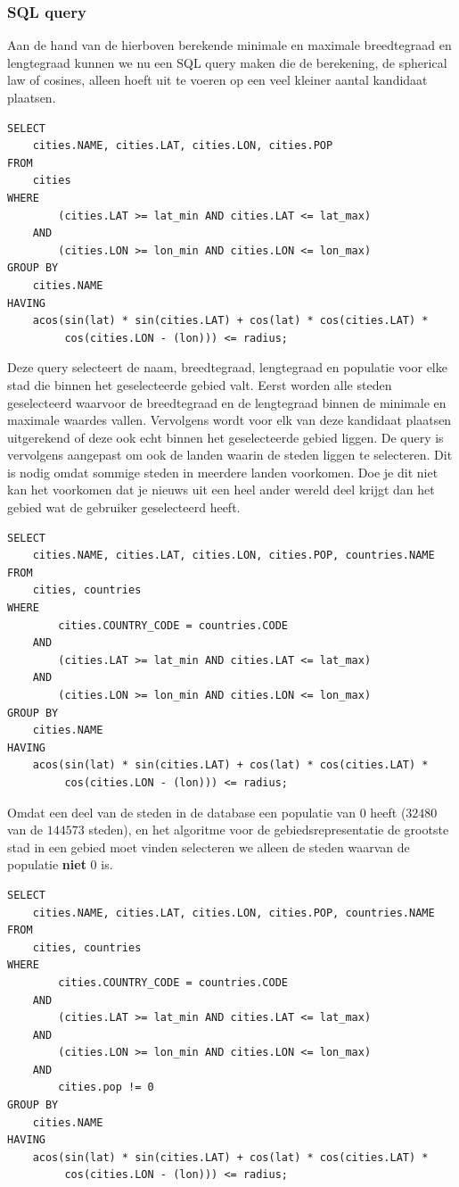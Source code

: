 \documentclass[twoside,openright]{uva-bachelor-thesis}
\begin{document}
		\subsubsection{SQL query}
		Aan de hand van de hierboven berekende minimale en maximale breedtegraad en lengtegraad kunnen we nu een SQL query maken die de berekening, de spherical law of cosines, alleen hoeft uit te voeren op een veel kleiner aantal kandidaat plaatsen.
\begin{verbatim}
SELECT
    cities.NAME, cities.LAT, cities.LON, cities.POP
FROM 
    cities 
WHERE 
        (cities.LAT >= lat_min AND cities.LAT <= lat_max) 
    AND 
        (cities.LON >= lon_min AND cities.LON <= lon_max) 
GROUP BY
    cities.NAME
HAVING
    acos(sin(lat) * sin(cities.LAT) + cos(lat) * cos(cities.LAT) * 
         cos(cities.LON - (lon))) <= radius;
\end{verbatim}
Deze query selecteert de naam, breedtegraad, lengtegraad en populatie voor elke stad die binnen het geselecteerde gebied valt. Eerst worden alle steden geselecteerd waarvoor de breedtegraad en de lengtegraad binnen de minimale en maximale waardes vallen. Vervolgens wordt voor elk van deze kandidaat plaatsen uitgerekend of deze ook echt binnen het geselecteerde gebied liggen. De query is vervolgens aangepast om ook de landen waarin de steden liggen te selecteren. Dit is nodig omdat sommige steden in meerdere landen voorkomen. Doe je dit niet kan het voorkomen dat je nieuws uit een heel ander wereld deel krijgt dan het gebied wat de gebruiker geselecteerd heeft.
\begin{verbatim}
SELECT
    cities.NAME, cities.LAT, cities.LON, cities.POP, countries.NAME
FROM 
    cities, countries 
WHERE
        cities.COUNTRY_CODE = countries.CODE 
    AND
        (cities.LAT >= lat_min AND cities.LAT <= lat_max) 
    AND 
        (cities.LON >= lon_min AND cities.LON <= lon_max) 
GROUP BY
    cities.NAME
HAVING
    acos(sin(lat) * sin(cities.LAT) + cos(lat) * cos(cities.LAT) * 
         cos(cities.LON - (lon))) <= radius;
\end{verbatim}
Omdat een deel van de steden in de database een populatie van $0$ heeft ($32480$ van de $144573$ steden), en het algoritme voor de gebiedsrepresentatie de grootste stad in een gebied moet vinden selecteren we alleen de steden waarvan de populatie \textbf{niet} $0$ is.
\begin{verbatim}
SELECT
    cities.NAME, cities.LAT, cities.LON, cities.POP, countries.NAME
FROM 
    cities, countries 
WHERE
        cities.COUNTRY_CODE = countries.CODE 
    AND
        (cities.LAT >= lat_min AND cities.LAT <= lat_max) 
    AND 
        (cities.LON >= lon_min AND cities.LON <= lon_max)
    AND
        cities.pop != 0
GROUP BY
    cities.NAME
HAVING
    acos(sin(lat) * sin(cities.LAT) + cos(lat) * cos(cities.LAT) * 
         cos(cities.LON - (lon))) <= radius;
\end{verbatim}
\end{document}
